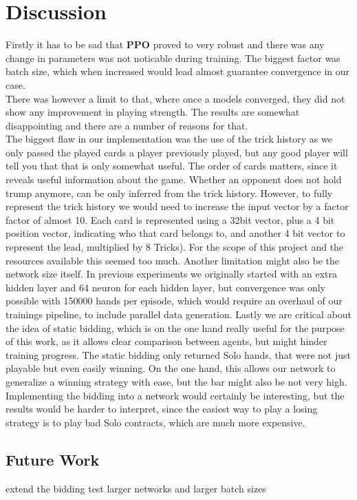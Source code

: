 \chapter{Discussion}
Firstly it has to be sad that \textbf{PPO} proved to very robust and there was any change in parameters was not
noticable during training.
The biggest factor was batch size, which when increased would lead almost guarantee convergence in our case.\\
There was however a limit to that, where once a models converged, they did not show any improvement in playing strength.
\newline
The results are somewhat disappointing and there are a number of reasons for that.\\
The biggest flaw in our implementation was the use of the trick history as we only passed the played cards a player
previously played, but any good player will tell you that that is only somewhat useful.
The order of cards matters, since it reveals useful information about the game.
Whether an opponent does not hold trump anymore, can be only inferred from the trick history.
However, to fully represent the trick history we would need to increase the input vector by a factor factor of almost
10.
Each card is represented using a 32bit vector, plus a 4 bit position vector, indicating who that card belongs to, and
another 4 bit vector to represent the lead, multiplied by 8 Tricks).
For the scope of this project and the resources available this seemed too much.
\newline
\newline
Another limitation might also be the network size itself.
In previous experiments we originally started with an extra hidden layer and 64 neuron for each hidden layer, but
convergence was only possible with 150000 hands per episode, which would require an overhaul of our trainings
pipeline, to include parallel data generation.
\newline
Lastly we are critical about the idea of static bidding, which is on the one hand really useful for the purpose of
this work, as it allows clear comparison between agents, but might hinder training progress.
The static bidding only returned Solo hands, that were not just playable but even easily winning.
On the one hand, this allows our network to generalize a winning strategy with ease, but the bar might also be not very
high.
\newline
Implementing the bidding into a network would certainly be interesting, but the results would be harder to interpret,
since the easiest way to play a losing strategy is to play bad Solo contracts, which are much more expensive.
\newline


\section{Future Work}
extend the bidding
test larger networks and larger batch sizes
